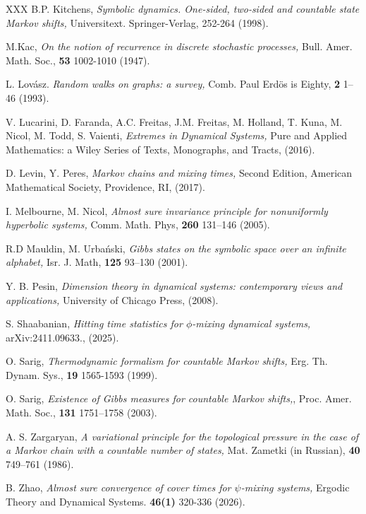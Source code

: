 \documentclass[11pt, reqno]{amsart}
\theoremstyle{plain}%
\theoremstyle{definition}
\theoremstyle{definition}
\numberwithin{equation}{section}
\begin{document}
\begin{thebibliography}{XXX}
B.P. Kitchens, \emph{Symbolic dynamics. One-sided, two-sided and countable state Markov shifts,} Universitext. Springer-Verlag, 252-264 (1998).

M.Kac, \emph{On the notion of recurrence in discrete stochastic processes,} Bull. Amer. Math. Soc., \textbf{53} 1002-1010 (1947).


L. Lovász. \emph{Random walks on graphs: a survey,} Comb. Paul Erdös is Eighty, \textbf{2} 1–46 (1993).


V. Lucarini, D. Faranda, A.C. Freitas, J.M. Freitas, M. Holland, T. Kuna, M. Nicol, M. Todd, S. Vaienti, \emph{Extremes in Dynamical Systems,} Pure and Applied Mathematics: a Wiley Series of Texts, Monographs, and Tracts, (2016).


D. Levin, Y. Peres, \emph{Markov chains and mixing times,} Second Edition, American Mathematical Society, Providence, RI, (2017).

I. Melbourne, M. Nicol, \emph{Almost sure invariance principle for nonuniformly hyperbolic systems,} Comm. Math. Phys, \textbf{260} 131–146 (2005).

R.D Mauldin, M. Urbański, \emph{Gibbs states on the symbolic space over an infinite alphabet,} Isr. J. Math, \textbf{125} 93–130 (2001).

Y. B. Pesin, \emph{Dimension theory in dynamical systems: contemporary views and applications,} University of
Chicago Press, (2008).

S. Shaabanian, \emph{Hitting time statistics for $\phi$-mixing dynamical systems,} arXiv:2411.09633., (2025).


O. Sarig, \emph{Thermodynamic formalism for countable Markov shifts,} Erg. Th. Dynam. Sys., \textbf{19} 1565-1593 (1999).

O. Sarig, \emph{Existence of Gibbs measures for countable Markov shifts,}, Proc. Amer. Math. Soc., \textbf{131} 1751–1758 (2003).




A. S. Zargaryan, \emph{A variational principle for the topological pressure in the case
of a Markov chain with a countable number of states,} Mat. Zametki (in Russian), \textbf{40}
749–761 (1986).


B. Zhao, \emph{Almost sure convergence of cover times for $\psi$-mixing
systems,} Ergodic Theory and Dynamical Systems. \textbf{46(1)} 320-336 (2026). 

 \end{thebibliography} 
 
\end{document}
